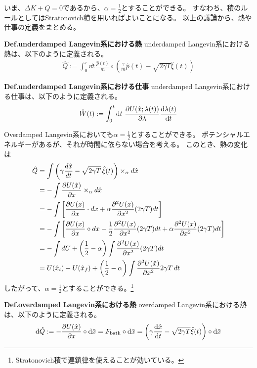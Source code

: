 \documentclass[a4paper,11pt]{jsarticle}
\numberwithin{equation}{section}
\begin{document}
いま、$\Delta K + Q = 0$であるから、$\alpha = \frac{1}{2}$とすることができる。
すなわち、積のルールとしてはStratonovich積を用いればよいことになる。
以上の議論から、熱や仕事の定義をまとめる。

\begin{itembox}[l]{\textbf{Def.underdamped Langevin系における熱}}
    underdamped Langevin系における熱は、以下のように定義される。
    \begin{align}
\hat{Q} := \int_0^\tau \dd{t} \, \frac{\hat{p}(t)}{m} \circ 
\left( \frac{\gamma}{m} \hat{p}(t) - \sqrt{2\gamma T} \hat{\xi}(t) \right)
\end{align}

\end{itembox}

\begin{itembox}[l]{\textbf{Def.underdamped Langevin系における仕事}}
    underdamped Langevin系における仕事は、以下のように定義される。
    \begin{align}
\hat{W}(t) := \int_0^t \dd{t} \, \pdv{U(\hat{x}; \lambda(t))}{\lambda} \dv{\lambda(t)}{t}
\end{align}
\end{itembox}

Overdamped Langevin系においても$\alpha = \frac{1}{2}$とすることができる。
ポテンシャルエネルギーがあるが、それが時間に依らない場合を考える。
このとき、熱の変化は
\begin{align}
\hat{Q} &= \int \left( \gamma \frac{d\hat{x}}{dt} - \sqrt{2\gamma T} \, \hat{\xi}(t) \right) \times_{\alpha} d\hat{x} \notag \\
&= - \int \frac{\partial U(\hat{x})}{\partial x} \times_{\alpha} d\hat{x} \notag \\
&= - \int \left[ \frac{\partial U(x)}{\partial x} \cdot dx + \alpha \frac{\partial^2 U(x)}{\partial x^2} (2\gamma T) dt \right] \notag \\
&= - \int \left[ \frac{\partial U(x)}{\partial x} \circ dx - \frac{1}{2} \frac{\partial^2 U(x)}{\partial x^2} (2\gamma T) dt + \alpha \frac{\partial^2 U(x)}{\partial x^2} (2\gamma T) dt \right] \notag \\
&= - \int dU + \left( \frac{1}{2} - \alpha \right) \int \frac{\partial^2 U(x)}{\partial x^2} (2\gamma T) dt \notag \\
&= U(\hat{x}_i) - U(\hat{x}_f) + \left( \frac{1}{2} - \alpha \right) \int \frac{\partial^2 U(\hat{x})}{\partial x^2} 2\gamma T \, dt  
\end{align}
したがって、$\alpha = \frac{1}{2}$とすることができる。\footnote{Stratonovich積で連鎖律を使えることが効いている。}
\begin{itembox}[l]{\textbf{Def.overdamped Langevin系における熱}}
    overdamped Langevin系における熱は、以下のように定義される。
    \begin{align}
\dd{\hat{Q}} := - \pdv{U(\hat{x})}{x} \circ \dd{\hat{x}} 
= F_{\text{bath}} \circ \dd{\hat{x}} 
= \left( \gamma \dv{\hat{x}}{t} - \sqrt{2\gamma T} \hat{\xi}(t) \right) \circ \dd{\hat{x}}
\end{align}

\end{itembox}
\end{document}
